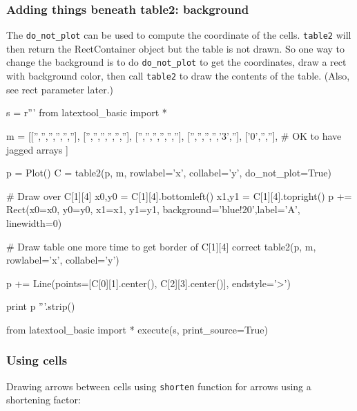 \newpage
\subsubsection{Adding things beneath table2: background}

The \verb!do_not_plot! can be used to compute the coordinate of the cells.
\verb!table2! will then return the RectContainer object but the table is not drawn.
So one way to change the background is to do \verb!do_not_plot!
to get the coordinates, draw a rect with background color,
then call \verb!table2! to draw the contents of the table.
(Also, see rect parameter later.)
\begin{python}
s = r'''
from latextool_basic import *

m = [['','','','','',''],
     ['','','','','',''],
     ['','','','','',''],
     ['','','','','3',''],
     ['0','',''],           # OK to have jagged arrays
     ]

p = Plot()
C = table2(p, m, rowlabel='x', collabel='y', do_not_plot=True)

# Draw over C[1][4]
x0,y0 = C[1][4].bottomleft()
x1,y1 = C[1][4].topright()
p += Rect(x0=x0, y0=y0, x1=x1, y1=y1,
          background='blue!20',label='A', linewidth=0)

# Draw table one more time to get border of C[1][4] correct
table2(p, m, rowlabel='x', collabel='y')

p += Line(points=[C[0][1].center(), C[2][3].center()], endstyle='>')

print p
'''.strip()

from latextool_basic import *
execute(s, print_source=True)
\end{python}









\newpage
\subsubsection{Using cells}

Drawing arrows between cells using \texttt{shorten} function for arrows
using a shortening factor:

